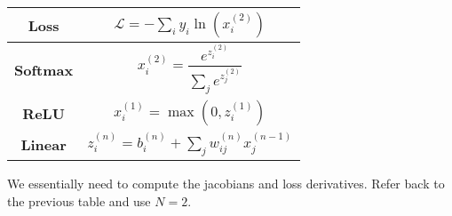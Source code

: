 \documentclass{article}
\begin{document}
    \begin{center}
    \renewcommand{\arraystretch}{2.5}
    \begin{tabular}{|c|c|}
    \hline
    \textbf{Loss} & $\mathcal{L} = -\sum_i y_i \ln(x_i^{(2)})$ \\
    \hline
    \textbf{Softmax} & $x_i^{(2)} = \dfrac{e^{z_i^{(2)}}}{\sum_j e^{z_j^{(2)}}}$ \\
    \hline
    \textbf{ReLU} & $x_i^{(1)} = \max(0, z_i^{(1)})$ \\
    \hline
    \textbf{Linear} & $z_i^{(n)} = b_{i}^{(n)} + \sum_{j}  w_{ij}^{(n)}x_j^{(n-1)}$ \\
    \hline
    \end{tabular}
    \end{center}

We essentially need to compute the jacobians and loss derivatives. Refer back to the previous table and use $N=2$.  
\end{document}
